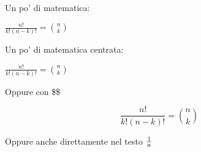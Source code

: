 \documentclass[twoside]{supsistudent}
\begin{document}
Un po' di matematica: \newline

\begin{math}
\frac{n!}{k!(n-k)!} = {n \choose k}
\end{math} \newline

Un po' di matematica centrata:

\begin{center}
\begin{math}
\frac{n!}{k!(n-k)!} = {n \choose k}
\end{math}
\end{center}

Oppure con \$\$

$$
\frac{n!}{k!(n-k)!} = {n \choose k}
$$

Oppure anche direttamente nel testo ${1}\over{n}$ \\

\lipsum[23]



\end{document}
